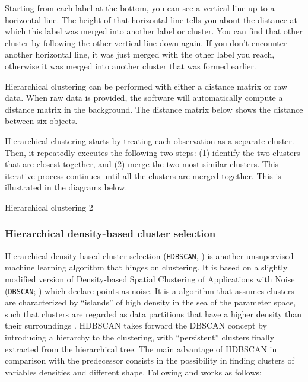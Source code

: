\documentclass[fleqn,usenatbib]{mnras}
\begin{document}
Starting from each label at the bottom, you can see a vertical line up to a
horizontal line. The height of that horizontal line tells you about the distance
at which this label was merged into another label or cluster. You can find that
other cluster by following the other vertical line down again. If you don't
encounter another horizontal line, it was just merged with the other label
you reach, otherwise it was merged into another cluster that was formed earlier.

Hierarchical clustering can be performed with either a distance matrix or raw data.
When raw data is provided, the software will automatically compute a distance
matrix in the background. The distance matrix below shows the distance between
six objects.

Hierarchical clustering starts by treating each observation as a separate cluster.
Then, it repeatedly executes the following two steps: (1) identify the two
clusters that are closest together, and (2) merge the two most similar clusters.
This iterative process continues until all the clusters are merged together.
This is illustrated in the diagrams below.

Hierarchical clustering 2

\subsubsection{Hierarchical density-based cluster selection}
\label{sec:hdbscan}

Hierarchical density-based cluster selection (\texttt{HDBSCAN}, \citealp{Campello:2013})
is another unsupervised machine learning algorithm that hinges on clustering.
It is based on a slightly modified version of Density-based Spatial
Clustering of Applications with Noise (\texttt{DBSCAN}; \citealp{Ester:1996}) which
declare points as noise. It is a algorithm that assumes clusters are characterized
by ``islands'' of high density in the sea of the parameter space, such
that clusters are regarded as data partitions that have a higher density
than their surroundings \citep{Ntwaetsile:2021}. HDBSCAN takes forward the
DBSCAN concept by introducing a hierarchy to the clustering, with ``persistent''
clusters finally extracted from the hierarchical tree. The main advantage of
HDBSCAN in comparison with the predecessor consists in the possibility in finding
clusters of variables densities and different shape. Following \citet{Malzer:2021}
and \citet{Ntwaetsile:2021} works as follows:
\end{document}
